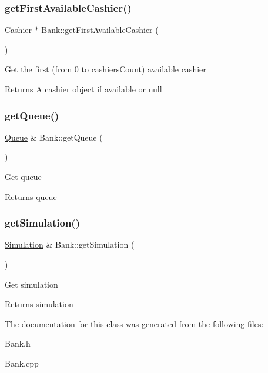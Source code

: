 \subsubsection{\texorpdfstring{get\+First\+Available\+Cashier()}{getFirstAvailableCashier()}}
{\footnotesize\ttfamily \hyperlink{classCashier}{Cashier} $\ast$ Bank\+::get\+First\+Available\+Cashier (\begin{DoxyParamCaption}{ }\end{DoxyParamCaption})}

Get the first (from 0 to cashiers\+Count) available cashier \begin{DoxyReturn}{Returns}
A cashier object if available or null 
\end{DoxyReturn}
\mbox{\label{classBank_a79644f520ee9fafdfa1ffa303b84bb4a}} 
\subsubsection{\texorpdfstring{get\+Queue()}{getQueue()}}
{\footnotesize\ttfamily \hyperlink{classQueue}{Queue} \& Bank\+::get\+Queue (\begin{DoxyParamCaption}{ }\end{DoxyParamCaption})}

Get queue \begin{DoxyReturn}{Returns}
queue 
\end{DoxyReturn}
\mbox{\label{classBank_a8d181c1cfdea6b987602f9e2954cb7ad}} 
\subsubsection{\texorpdfstring{get\+Simulation()}{getSimulation()}}
{\footnotesize\ttfamily \hyperlink{classSimulation}{Simulation} \& Bank\+::get\+Simulation (\begin{DoxyParamCaption}{ }\end{DoxyParamCaption})}

Get simulation \begin{DoxyReturn}{Returns}
simulation 
\end{DoxyReturn}


The documentation for this class was generated from the following files\+:\begin{DoxyCompactItemize}
\item 
Bank.\+h\item 
Bank.\+cpp\end{DoxyCompactItemize}
